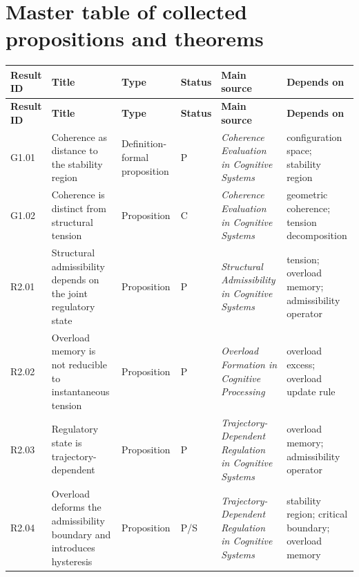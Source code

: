 \documentclass[12pt]{article}
\begin{document}
	\section{Master table of collected propositions and theorems}
	
	\begin{longtable}{>{\RaggedRight\arraybackslash}p{}
			>{\RaggedRight\arraybackslash}p{}
			>{\RaggedRight\arraybackslash}p{}
			>{\RaggedRight\arraybackslash}p{}
			>{\RaggedRight\arraybackslash}p{}
			>{\RaggedRight\arraybackslash}p{}}
		\toprule
		\textbf{Result ID} & \textbf{Title} & \textbf{Type} & \textbf{Status} & \textbf{Main source} & \textbf{Depends on} \\
		\midrule
		\endfirsthead
		\toprule
		\textbf{Result ID} & \textbf{Title} & \textbf{Type} & \textbf{Status} & \textbf{Main source} & \textbf{Depends on} \\
		\midrule
		\endhead
		
		G1.01 & Coherence as distance to the stability region & Definition-formal proposition & P & \emph{Coherence Evaluation in Cognitive Systems} & configuration space; stability region \\
		
		G1.02 & Coherence is distinct from structural tension & Proposition & C & \emph{Coherence Evaluation in Cognitive Systems} & geometric coherence; tension decomposition \\
		
		R2.01 & Structural admissibility depends on the joint regulatory state & Proposition & P & \emph{Structural Admissibility in Cognitive Systems} & tension; overload memory; admissibility operator \\
		
		R2.02 & Overload memory is not reducible to instantaneous tension & Proposition & P & \emph{Overload Formation in Cognitive Processing} & overload excess; overload update rule \\
		
		R2.03 & Regulatory state is trajectory-dependent & Proposition & P & \emph{Trajectory-Dependent Regulation in Cognitive Systems} & overload memory; admissibility operator \\
		
		R2.04 & Overload deforms the admissibility boundary and introduces hysteresis & Proposition & P/S & \emph{Trajectory-Dependent Regulation in Cognitive Systems} & stability region; critical boundary; overload memory \\
		

\end{longtable}
\end{document}
